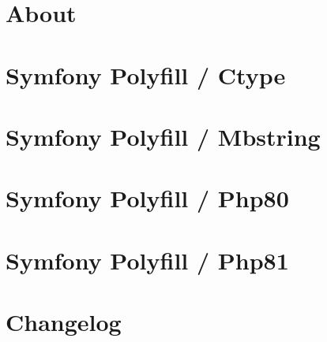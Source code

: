 \documentclass[twoside]{book}
\newcommand{\+}{\discretionary{\mbox{\scriptsize$\hookleftarrow$}}{}{}}
\begin{document}
\chapter{About}
\label{md__c__workspace__proyecto__p_h_p_project_vendor_squizlabs_php_codesniffer__r_e_a_d_m_e}

\chapter{Symfony Polyfill / Ctype}
\label{md__c__workspace__proyecto__p_h_p_project_vendor_symfony_polyfill_ctype__r_e_a_d_m_e}

\chapter{Symfony Polyfill / Mbstring}
\label{md__c__workspace__proyecto__p_h_p_project_vendor_symfony_polyfill_mbstring__r_e_a_d_m_e}

\chapter{Symfony Polyfill / Php80}
\label{md__c__workspace__proyecto__p_h_p_project_vendor_symfony_polyfill_php80__r_e_a_d_m_e}

\chapter{Symfony Polyfill / Php81}
\label{md__c__workspace__proyecto__p_h_p_project_vendor_symfony_polyfill_php81__r_e_a_d_m_e}

\chapter{Changelog}
\label{md__c__workspace__proyecto__p_h_p_project_vendor_theseer_tokenizer__c_h_a_n_g_e_l_o_g}

\end{document}
